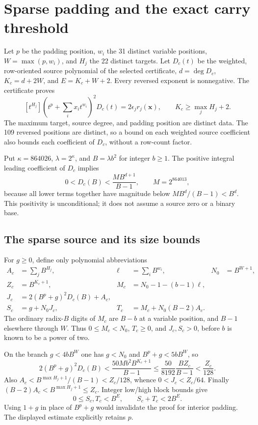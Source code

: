 \section{Sparse padding and the exact carry threshold}
\label{sec:carry8}
Let $p$ be the padding position, $w_i$ the 31 distinct variable positions,
$W=\max(p,w_i)$, and $H_j$ the 22 distinct targets. Let $D_c(t)$ be the
weighted, row-oriented source polynomial of the selected certificate,
$d=\deg D_c$, $K_c=d+2W$, and $E=K_c+W+2$. Every reversed exponent is
nonnegative. The certificate proves
\[
 [t^{H_j}]\left(t^p+\sum_i x_it^{w_i}\right)^2D_c(t)
     =2\epsilon_jr_j(\mathbf x),\qquad
 K_c\ge\max_jH_j+2.
\]
The maximum target, source degree, and padding position are distinct data.
The 109 reversed positions are distinct, so a bound on each weighted source
coefficient also bounds each coefficient of $D_c$, without a row-count factor.

Put $\kappa=864026$, $\lambda=2^\kappa$, and $B=\lambda b^2$ for integer
$b\ge1$. The positive integral leading coefficient of $D_c$ implies
\[
 0<D_c(B)<\frac{MB^{d+1}}{B-1},\qquad M=2^{864013},
\]
because all lower terms together have magnitude below $MB^d/(B-1)<B^d$.
This positivity is unconditional; it does not assume a source zero or a
binary base.

\subsection{The sparse source and its size bounds}
For $g\ge0$, define only polynomial abbreviations
\begin{align*}
 A_c&=\sum_jB^{H_j},&\ell&=\sum_iB^{w_i},&N_0&=B^{W+1},\\
 Z_c&=B^{K_c+1},&M_c&=N_0-1-(b-1)\ell,&&\\
 J_c&=2(B^p+g)^2D_c(B)+A_c,&&&&\\
 S_c&=g+N_0J_c,&T_c&=M_c+N_0(B-2)A_c.&&
\end{align*}
The ordinary radix-$B$ digits of $M_c$ are $B-b$ at a variable position,
and $B-1$ elsewhere through $W$. Thus $0\le M_c<N_0$, $T_c\ge0$,
and $J_c,S_c>0$, before $b$ is known to be a power of two.

On the branch $g<4bB^W$ one has $g<N_0$ and $B^p+g<5bB^W$, so
\[
 2(B^p+g)^2D_c(B)
 <\frac{50Mb^2B^{K_c+1}}{B-1}
 \le\frac{50}{8192}\frac{BZ_c}{B-1}<\frac{Z_c}{128}.
\]
Also $A_c<B^{\max H_j+1}/(B-1)<Z_c/128$, whence
$0<J_c<Z_c/64$. Finally $(B-2)A_c<B^{\max H_j+1}\le Z_c$.
Integer low/high block bounds give
\[
             0\le S_c,T_c<B^E,\qquad S_c+T_c<2B^E.       \tag{C1}
\]
Using $1+g$ in place of $B^p+g$ would invalidate the proof for interior
padding. The displayed estimate explicitly retains $p$.

